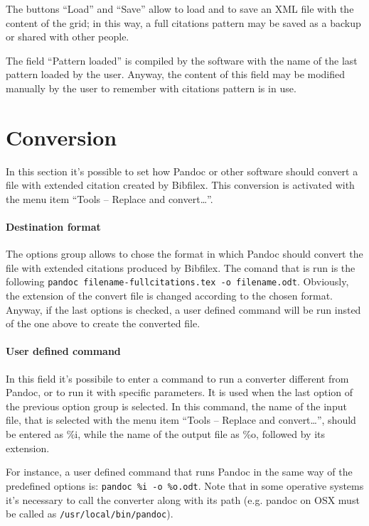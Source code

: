 \documentclass[a4paper,12pt]{report}
\begin{document}
The buttons “Load” and “Save” allow to load and to save an XML file with the content of the grid; in this way, a full citations pattern may be saved as a backup or shared with other people.

The field “Pattern loaded” is compiled by the software with the name of the last pattern loaded by the user. Anyway, the content of this field may be modified manually by the user to remember with citations pattern is in use.

\section{Conversion}

In this section it's possible to set how Pandoc or other software should convert a file with extended citation created by Bibfilex. This conversion is activated with the menu item “Tools -- Replace and convert\dots”.

\paragraph{Destination format} The options group allows to chose the format in which Pandoc should convert the file with extended citations produced by Bibfilex. The comand that is run is the following \texttt{pandoc filename-fullcitations.tex -o filename.odt}. Obviously, the extension of the convert file is changed according to the chosen format. Anyway, if the last options is checked, a user defined command will be run insted of the one above to create the converted file.

\paragraph{User defined command} In this field it's possibile to enter a command to run a converter different from Pandoc, or to run it with specific parameters. It is used when the last option of the previous option group is selected. In this command, the name of the input file, that is selected with the menu item “Tools -- Replace and convert\dots”, should be entered as \%i, while the name of the output file as \%o, followed by its extension.

\noindent For instance, a user defined command that runs Pandoc in the same way of the predefined options is: \texttt{pandoc \%i -o \%o.odt}. Note that in some operative systems it's necessary to call the converter along with its path (e.g. pandoc on OSX must be called as \texttt{/usr/local/bin/pandoc}).
\end{document}
